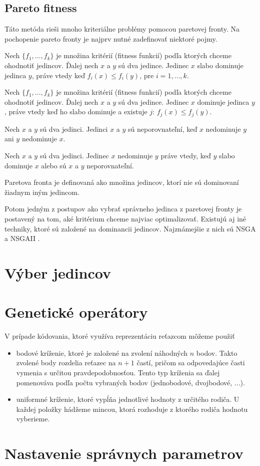 \subsection{Pareto fitness}\label{kap2:2.3:2.3.3:Pareto}
Táto metóda rieši mnoho kriteriálne problémy pomocou paretovej fronty. Na pochopenie pareto fronty je najprv nutné zadefinovať niektoré pojmy.
\begin{def-sk}
Nech $\{f_{1}, \ldots, f_{k}\}$ je množina kritérií (fitness funkcií) podľa ktorých chceme ohodnotiť jedincov. Ďalej nech $x$ a $y$ sú dva jedince. Jedinec $x$ slabo dominuje jedinca $y$, práve vtedy keď $f_{i}(x) \leq f_{i}(y)$, pre $i = 1,\ldots,k$.
\end{def-sk}
\begin{def-sk}
Nech $\{f_{1}, \ldots, f_{k}\}$ je množina kritérií (fitness funkcií) podľa ktorých chceme ohodnotiť jedincov. Ďalej nech $x$ a $y$ sú dva jedince. Jedinec $x$ dominuje jedinca $y$, práve vtedy keď ho slabo dominuje a existuje $j$: $f_{j}(x) \le f_{j}(y)$.
\end{def-sk}
\begin{def-sk}
Nech $x$ a $y$ sú dva jedinci. Jedinci $x$ a $y$ sú neporovnateľní, keď $x$ nedominuje $y$ ani $y$ nedominuje $x$.
\end{def-sk}
\begin{def-sk}
Nech $x$ a $y$ sú dva jedinci. Jedinec $x$ nedominuje $y$ práve vtedy, keď $y$ slabo dominuje $x$ alebo sú $x$ a $y$ neporovnateľní.
\end{def-sk}
\begin{def-sk}
Paretova fronta je definovaná ako množina jedincov, ktorí nie sú dominovaní žiadnym iným jedincom.
\end{def-sk}
Potom jedným z postupov ako vybrať správneho jedinca z paretovej fronty je postavený na tom, aké kritérium chceme najviac optimalizovať. Existujú aj iné techniky, ktoré sú založené na dominancii jedincov. Najznámejšie z nich sú NSGA a NSGAII \cite{online-NSGA}.

\section{Výber jedincov}\label{kap2:2.4:Selection}

\section{Genetické operátory}\label{kap2:2.5:Operators}
V prípade kódovania, ktoré využíva reprezentáciu reťazcom môžeme použiť
\begin{itemize}
\item bodové kríženie, ktoré je založené na zvolení náhodných $n$ bodov. Takto zvolené body rozdelia reťazec na $n+1$ častí, pričom sa odpovedajúce časti vymenia s určitou pravdepodobnosťou. Tento typ kríženia sa ďalej pomenováva podľa počtu vybraných bodov (jednobodové, dvojbodové, ...).
\item uniformné kríženie, ktoré vypĺňa jednotlivé hodnoty z určitého rodiča. U každej položky hádžeme mincou, ktorá rozhoduje z ktorého rodiča hodnotu vyberieme.
\end{itemize}

\section{Nastavenie správnych parametrov}\label{kap2:2.6:Parameters}

